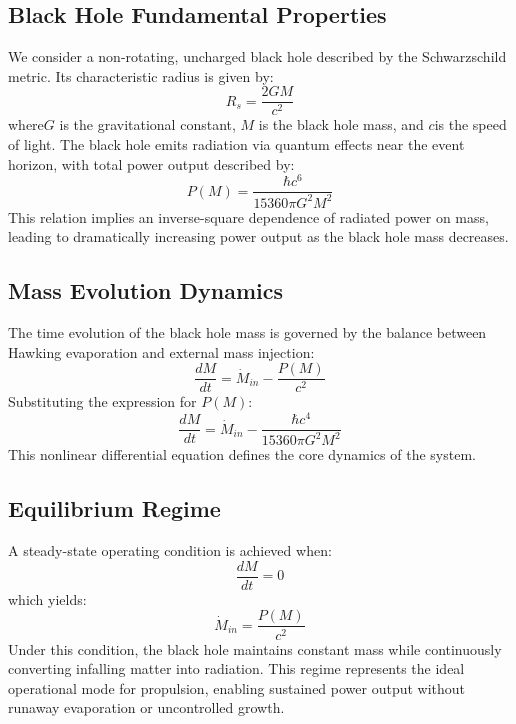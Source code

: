\documentclass[conference]{IEEEtran}
\begin{document}
\subsection{Black Hole Fundamental Properties}
We consider a non-rotating, uncharged black hole described by the Schwarzschild metric. Its characteristic radius is given by:
\begin{equation}
R_s = \frac{2GM}{c^2}
\end{equation}
where\( G \) is the gravitational constant, \( M \) is the black hole mass, and \( c \)is the speed of light.
The black hole emits radiation via quantum effects near the event horizon, with total power output described by:
\begin{equation}
P(M)=\frac{\hbar c^6}{15360\pi G^2 M^2}
\end{equation}
This relation implies an inverse-square dependence of radiated power on mass, leading to dramatically increasing power output as the black hole mass decreases.
\subsection{Mass Evolution Dynamics}
The time evolution of the black hole mass is governed by the balance between Hawking evaporation and external mass injection:
\begin{equation}
\frac{dM}{dt} = \dot{M}_{in} - \frac{P(M)}{c^2}
\end{equation}
Substituting the expression for \( P(M) \):
\begin{equation}
\frac{dM}{dt}=\dot{M}_{in}-\frac{\hbar c^4}{15360\pi G^2M^2}
\end{equation}
This nonlinear differential equation defines the core dynamics of the system.
\subsection{Equilibrium Regime}
A steady-state operating condition is achieved when:
\begin{equation}
\frac{dM}{dt}=0
\end{equation}
which yields:
\begin{equation}
\dot{M}_{in} = \frac{P(M)}{c^2}
\end{equation}
Under this condition, the black hole maintains constant mass while continuously converting infalling matter into radiation. This regime represents the ideal operational mode for propulsion, enabling sustained power output without runaway evaporation or uncontrolled growth.
\end{document}
